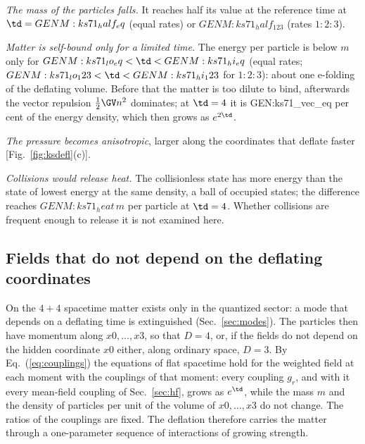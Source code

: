 \emph{The mass of the particles falls.} It reaches half its value at the reference time at
$\td={{GENM:ks71_half_eq}}$ (equal rates) or ${{GENM:ks71_half_123}}$ (rates $1:2:3$).

\emph{Matter is self-bound only for a limited time.} The energy per particle is below $m$ only for
${{GENM:ks71_lo_eq}}<\td<{{GENM:ks71_hi_eq}}$ (equal rates;
${{GENM:ks71_lo_123}}<\td<{{GENM:ks71_hi_123}}$ for $1:2:3$): about one e-folding of the deflating
volume. Before that the matter is too dilute to bind, afterwards the vector repulsion
$\tfrac12\GV n^{2}$ dominates; at $\td=4$ it is {{GEN:ks71_vec_eq}} per cent of the energy density,
which then grows as $e^{2\td}$.

\emph{The pressure becomes anisotropic}, larger along the coordinates that deflate faster
[Fig.~\ref{fig:ksdefl}(c)].

\emph{Collisions would release heat.} The collisionless state has more energy than the state of
lowest energy at the same density, a ball of occupied states; the difference reaches
${{GENM:ks71_heat}}\,m$ per particle at $\td=4$. Whether collisions are frequent enough to release it
is not examined here.

\subsection{Fields that do not depend on the deflating coordinates}
\label{sec:ksreduced}

On the $4+4$ spacetime matter exists only in the quantized sector: a mode that depends on a
deflating time is extinguished (Sec.~\ref{sec:modes}). The particles then have momentum along
$x0,\dots,x3$, so that $D=4$, or, if the fields do not depend on the hidden coordinate $x0$ either,
along ordinary space, $D=3$. By Eq.~(\ref{eq:couplings}) the equations of flat spacetime hold for the
weighted field at each moment with the couplings of that moment: every coupling $g_r$, and with it
every mean-field coupling of Sec.~\ref{sec:hf}, grows as $e^{\td}$, while the mass $m$ and the
density of particles per unit of the volume of $x0,\dots,x3$ do not change. The ratios of the
couplings are fixed. The deflation therefore carries the matter through a one-parameter sequence of
interactions of growing strength.

